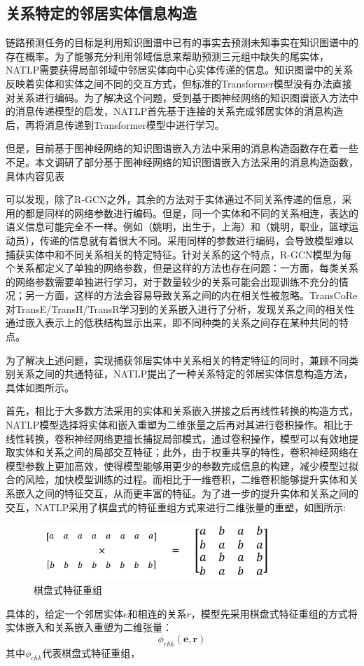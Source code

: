 \subsection{关系特定的邻居实体信息构造}

链路预测任务的目标是利用知识图谱中已有的事实去预测未知事实在知识图谱中的存在概率。为了能够充分利用邻域信息来帮助预测三元组中缺失的尾实体，NATLP需要获得局部邻域中邻居实体向中心实体传递的信息。知识图谱中的关系反映着实体和实体之间不同的交互方式，但标准的Transformer模型没有办法直接对关系进行编码。为了解决这个问题，受到基于图神经网络的知识图谱嵌入方法中的消息传递模型的启发，NATLP首先基于连接的关系完成邻居实体的消息构造后，再将消息传递到Transformer模型中进行学习。

但是，目前基于图神经网络的知识图谱嵌入方法中采用的消息构造函数存在着一些不足。本文调研了部分基于图神经网络的知识图谱嵌入方法采用的消息构造函数，具体内容见表

可以发现，除了R-GCN之外，其余的方法对于实体通过不同关系传递的信息，采用的都是同样的网络参数进行编码。但是，同一个实体和不同的关系相连，表达的语义信息可能完全不一样。例如（姚明，出生于，上海）和（姚明，职业，篮球运动员），传递的信息就有着很大不同。采用同样的参数进行编码，会导致模型难以捕获实体中和不同关系相关的特定特征。针对关系的这个特点，R-GCN模型为每个关系都定义了单独的网络参数，但是这样的方法也存在问题：一方面，每类关系的网络参数需要单独进行学习，对于数量较少的关系可能会出现训练不充分的情况；另一方面，这样的方法会容易导致关系之间的内在相关性被忽略。TransCoRe对TransE/TransH/TransR学习到的关系嵌入进行了分析，发现关系之间的相关性通过嵌入表示上的低秩结构显示出来，即不同种类的关系之间存在某种共同的特点。

为了解决上述问题，实现捕获邻居实体中关系相关的特定特征的同时，兼顾不同类别关系之间的共通特征，NATLP提出了一种关系特定的邻居实体信息构造方法，具体如图所示。

首先，相比于大多数方法采用的实体和关系嵌入拼接之后再线性转换的构造方式，NATLP模型选择将实体和嵌入重塑为二维张量之后再对其进行卷积操作。相比于线性转换，卷积神经网络更擅长捕捉局部模式，通过卷积操作，模型可以有效地提取实体和关系之间的局部交互特征；此外，由于权重共享的特性，卷积神经网络在模型参数上更加高效，使得模型能够用更少的参数完成信息的构建，减少模型过拟合的风险，加快模型训练的过程。而相比于一维卷积，二维卷积能够提升实体和关系嵌入之间的特征交互，从而更丰富的特征。为了进一步的提升实体和关系之间的交互，NATLP采用了棋盘式的特征重组方式来进行二维张量的重塑，如图所示:

\begin{figure}[htb]
  \centerline{\includegraphics[width=0.8\textwidth]{pic/cross_conv.pdf}}
  \caption{棋盘式特征重组}
  \label{cross_conv}
\end{figure}

具体的，给定一个邻居实体$e$和相连的关系$r$，模型先采用棋盘式特征重组的方式将实体嵌入和关系嵌入重塑为二维张量：
\begin{equation}
  \phi_{chk}\left(\boldsymbol{e},\boldsymbol{r}\right) 
\end{equation}
其中$\phi_{chk}$代表棋盘式特征重组，

